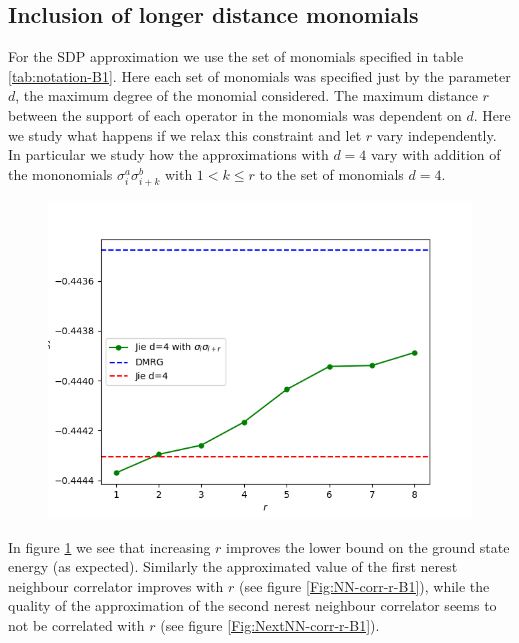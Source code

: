 \documentclass[10pt,a4paper,twoside,twocolumn]{revtex4-1}
\begin{document}
\subsection{Inclusion of longer distance monomials} 
\label{par:parameter-r}
For the SDP approximation we use the set of monomials specified in table \ref{tab:notation-B1}. Here each set of monomials was specified just by the parameter $d$, the maximum degree of the  monomial considered. The maximum distance $r$ between the support of each operator in the monomials was dependent on $d$. Here we study what happens if we relax this constraint and let $r$ vary independently. In particular we study how the approximations with $d=4$ vary with addition of the mononomials $\sigma^{a}_{i}\sigma^{b}_{i+k}$ with $1<k\leq r$ to the set of monomials $d=4$. 
\begin{figure}[H]
  \centerline{
\includegraphics[width=1.\linewidth]{Figures/B1/L=50,_r_parameter.png}}
  \label{Fig:GSE-r-B1}
\end{figure}
In figure \ref{Fig:GSE-r-B1} we see that increasing $r$ improves the lower bound on the ground state energy (as expected). Similarly the approximated value of the first nerest neighbour correlator improves with $r$ (see figure \ref{Fig:NN-corr-r-B1}), while the quality of the approximation of the second nerest neighbour correlator seems to not be correlated with $r$ (see figure \ref{Fig:NextNN-corr-r-B1}).
\end{document}
